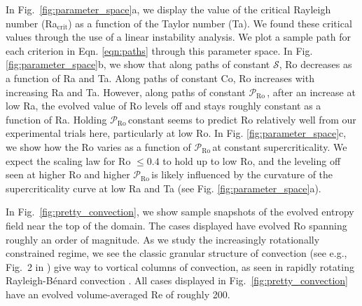 \documentclass[twocolumn, amsmath, amsfonts, amssymb]{aastex62}
\newcommand{\RB}{Rayleigh-B\'{e}nard }
\newcommand{\pro}{\ensuremath{\mathcal{P}_{\text{Ro}}\,}}
\begin{document}
\label{sec:results}
In Fig.~\ref{fig:parameter_space}a, we display the value of the critical Rayleigh number 
(Ra$_{\text{crit}}$) as a function of the Taylor number (Ta). We found these critical
values through the use of a linear instability analysis. We plot a sample path for
each criterion in Eqn. \ref{eqn:paths} through
this parameter space.
In Fig. \ref{fig:parameter_space}b, we show that along paths of
constant $\mathcal{S}$, Ro 
decreases as a function of Ra and Ta. Along paths of constant Co, Ro increases
with increasing Ra and Ta. However, along paths of constant \pro, 
after an increase at low Ra, the evolved value of Ro levels off and stays roughly constant
as a function of Ra. Holding \pro constant seems to predict Ro relatively
well from our experimental trials here, particularly at low Ro. 
In Fig. \ref{fig:parameter_space}c, we
show how the Ro varies as a function of \pro at constant supercriticality.
We expect the scaling law for Ro $\leq 0.4$ to hold up to low Ro, and the
leveling off seen at higher Ro and higher \pro is likely influenced by the
curvature of the supercriticality curve at low Ra and Ta (see Fig. \ref{fig:parameter_space}a).


In Fig.~\ref{fig:pretty_convection}, we show sample snapshots of the evolved entropy field
near the top of the domain. The cases displayed have evolved Ro spanning roughly an order
of magnitude. As we study the increasingly rotationally constrained regime, we see the
classic granular structure of convection (see e.g., Fig.~2 in \AB) give way to vortical
columns of convection, as seen in rapidly rotating \RB convection \citep{stellmach&all2014}.
All cases displayed in Fig.~\ref{fig:pretty_convection} have an evolved volume-averaged
Re of roughly 200.
\end{document}
